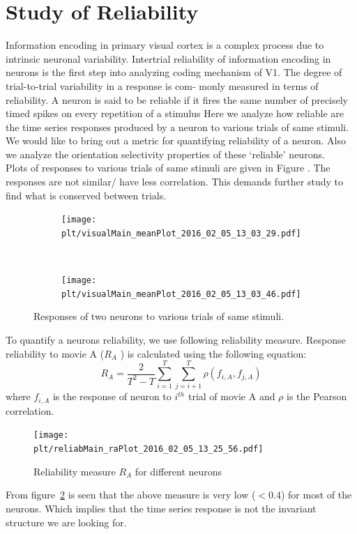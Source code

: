 \documentclass[11pt]{article}
\newcommand{\plt}{../../plots}
\begin{document}
\section{Study of Reliability} %
\label{sec:study_of_reliability}
Information encoding in primary visual cortex is a complex process due to intrinsic neuronal variability. Intertrial reliability of information encoding in neurons is the first step into analyzing coding mechanism of V1. The degree of trial-to-trial variability in a response is com-
monly measured in terms of reliability. A neuron is said to be reliable if it fires the same number of precisely timed spikes on every repetition of a stimulus
Here we analyze how reliable are the time series responses produced by a neuron to various trials of same stimuli. We would like to bring out a metric for quantifying reliability of a neuron. Also we analyze the orientation selectivity properties of these `reliable' neurons.\\
Plots of responses to various trials of same stimuli are given in Figure . The responses are not similar/ have less correlation. This demands further study to find what is conserved between trials.
\begin{figure}
    \centering
    \begin{subfigure}[b]{.48\textwidth}
        \centering
        \texttt{[image: \\plt/visualMain\_meanPlot\_2016\_02\_05\_13\_03\_29.pdf]}
    \end{subfigure}
    ~
    \begin{subfigure}[b]{.48\textwidth}
        \centering
        \texttt{[image: \\plt/visualMain\_meanPlot\_2016\_02\_05\_13\_03\_46.pdf]}
    \end{subfigure}
    \caption{Responses of two neurons to various trials of same stimuli.}
    \label{img:responses}
\end{figure}
To quantify a neurons reliability,  we use following reliability measure. Response reliability to movie A ($R_A$ ) is calculated using the
following equation:
$$R_A = \frac{2}{T^2 - T}\sum_{i=1}^T \sum_{j=i+1}^T \rho(f_{i, A}, f_{j, A})$$
where $f_{i, A}$ is the response of neuron to $i^{th}$ trial of movie A and $\rho$ is the Pearson correlation.\\

\begin{figure}
    \centering
    \texttt{[image: \\plt/reliabMain\_raPlot\_2016\_02\_05\_13\_25\_56.pdf]}
    \caption{Reliability measure $R_A$ for different neurons}
    \label{img:ra}
\end{figure}
From figure~\ref{img:ra} is seen that the above measure is very low ($<0.4$) for most of the neurons. Which implies that the time series response is not the invariant structure we are looking for. 
\end{document}

